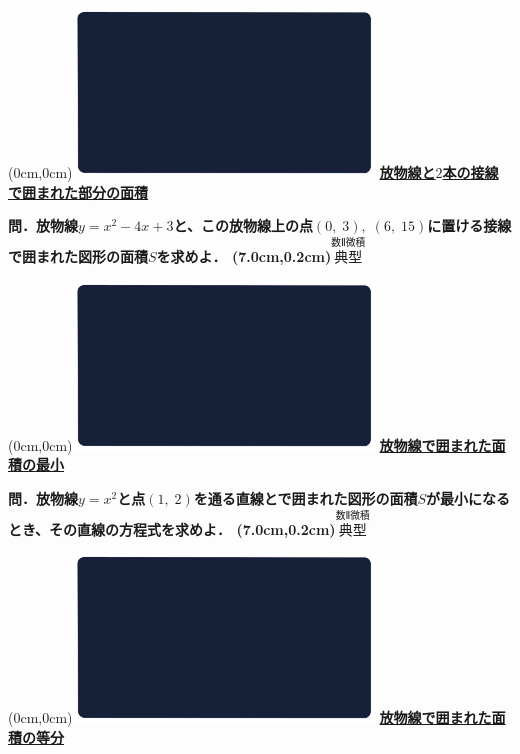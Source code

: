\documentclass[10pt,
fleqn,
dvipdfmx,
uplatex
]{jsarticle}
\begin{document}
\at(0cm,0cm){\includegraphics[width=8cm,bb=0 0 1920 1080]{./youtube/thumbnails/templates/smart_background/数II微積.jpeg}}
{\color{orange}\bf\boldmath\normalsize\underline{放物線と$2$本の接線で囲まれた部分の面積}}\vspace{0.3zw}

\LARGE 
\bf\boldmath 問．放物線$y=x^2-4x+3$と、この放物線上の点$\left(0,\;3\right),\;\left(6,\;{15}\right)$に置ける接線で囲まれた図形の面積$S$を求めよ．
\at(7.0cm,0.2cm){\small\color{bradorange}$\overset{\text{数Ⅱ微積}}{\text{典型}}$}


\newpage



\at(0cm,0cm){\includegraphics[width=8cm,bb=0 0 1920 1080]{./youtube/thumbnails/templates/smart_background/数II微積.jpeg}}
{\color{orange}\bf\boldmath\Large\underline{放物線で囲まれた面積の最小}}\vspace{0.3zw}

\Large 
\bf\boldmath 問．放物線$y=x^2$と点$\left(1,\;2\right)$を通る直線とで囲まれた図形の面積$S$が最小になるとき、その直線の方程式を求めよ．
\at(7.0cm,0.2cm){\small\color{bradorange}$\overset{\text{数Ⅱ微積}}{\text{典型}}$}


\newpage



\at(0cm,0cm){\includegraphics[width=8cm,bb=0 0 1920 1080]{./youtube/thumbnails/templates/smart_background/数II微積.jpeg}}
{\color{orange}\bf\boldmath\Large\underline{放物線で囲まれた面積の等分}}\vspace{0.3zw}
\end{document}
